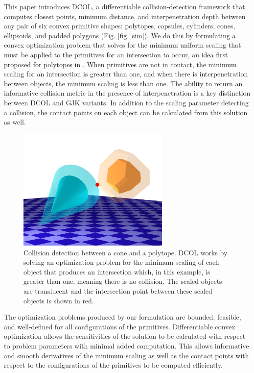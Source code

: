 This paper introduces DCOL, a differentiable collision-detection framework that computes closest points, minimum distance, and interpenetration depth between any pair of six convex primitive shapes: polytopes, capsules, cylinders, cones, ellipsoids, and padded polygons (Fig. \ref{fig_sim}). We do this by formulating a convex optimization problem that solves for the minimum uniform scaling that must be applied to the primitives for an intersection to occur, an idea first proposed for polytopes in \cite{gilbert1994}. When primitives are not in contact, the minimum scaling for an intersection is greater than one, and when there is interpenetration between objects, the minimum scaling is less than one.  The ability to return an informative collision metric in the presence of interpenetration is a key distinction between DCOL and GJK variants.  In addition to the scaling parameter detecting a collision, the contact points on each object can be calculated from this solution as well.
\begin{figure}[t!]
\centerline{\includegraphics[width = 7.5cm]{figures/cone_poly_v9.png}}
\caption{Collision detection between a cone and a polytope. DCOL works by solving an optimization problem for the minimum scaling of each object that produces an intersection which, in this example, is greater than one, meaning there is no collision. The scaled objects are translucent and the intersection point between these scaled objects is shown in red.}
\label{fig:conepoly}
\end{figure}

The optimization problems produced by our formulation are bounded, feasible, and well-defined for all configurations of the primitives. Differentiable convex optimization allows the sensitivities of the solution to be calculated with respect to problem parameters with minimal added computation. This allows informative and smooth derivatives of the minimum scaling as well as the contact points with respect to the configurations of the primitives to be computed efficiently.

